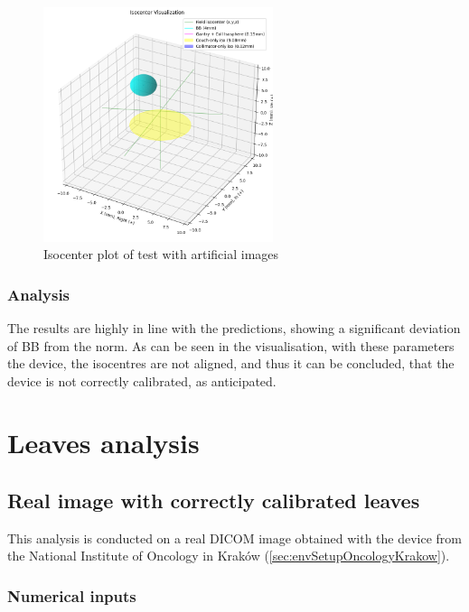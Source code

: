 \begin{figure}[H]
    \centering
    \includegraphics[width=0.60\textwidth]{Content/Images/analysis_wl_artificial_isocenter_plot.png}
    \caption{Isocenter plot of test with artificial images}
\end{figure}

\subsubsection{Analysis}

The results are highly in line with the predictions, showing a significant deviation of BB from the norm. As can be seen in the visualisation, with these parameters the device, the isocentres are not aligned, and thus it can be concluded, that the device is not correctly calibrated, as anticipated.

\section{Leaves analysis}

\subsection{Real image with correctly calibrated leaves} \label{sec:laExampleCalibrated}

This analysis is conducted on a real DICOM image obtained with the device from the National Institute of Oncology in Kraków (\autoref{sec:envSetupOncologyKrakow}).

\subsubsection{Numerical inputs}

